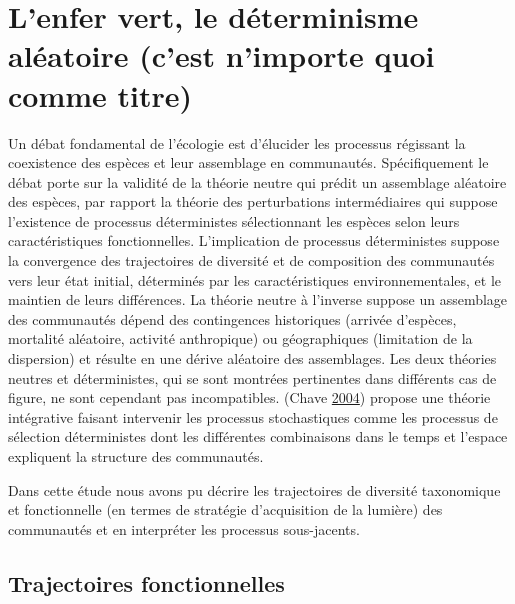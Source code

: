\documentclass[11pt,french,A4paper,extrafontsizes,onecolumn,openright]{memoir}
\begin{document}
\section{L'enfer vert, le déterminisme aléatoire (c'est n'importe quoi
comme
titre)}\label{lenfer-vert-le-determinisme-aleatoire-cest-nimporte-quoi-comme-titre}

Un débat fondamental de l'écologie est d'élucider les processus
régissant la coexistence des espèces et leur assemblage en communautés.
Spécifiquement le débat porte sur la validité de la théorie neutre qui
prédit un assemblage aléatoire des espèces, par rapport la théorie des
perturbations intermédiaires qui suppose l'existence de processus
déterministes sélectionnant les espèces selon leurs caractéristiques
fonctionnelles. L'implication de processus déterministes suppose la
convergence des trajectoires de diversité et de composition des
communautés vers leur état initial, déterminés par les caractéristiques
environnementales, et le maintien de leurs différences. La théorie
neutre à l'inverse suppose un assemblage des communautés dépend des
contingences historiques (arrivée d'espèces, mortalité aléatoire,
activité anthropique) ou géographiques (limitation de la dispersion) et
résulte en une dérive aléatoire des assemblages. Les deux théories
neutres et déterministes, qui se sont montrées pertinentes dans
différents cas de figure, ne sont cependant pas incompatibles. (Chave
\protect\hyperlink{ref-Chave2004}{2004}) propose une théorie intégrative
faisant intervenir les processus stochastiques comme les processus de
sélection déterministes dont les différentes combinaisons dans le temps
et l'espace expliquent la structure des communautés.

Dans cette étude nous avons pu décrire les trajectoires de diversité
taxonomique et fonctionnelle (en termes de stratégie d'acquisition de la
lumière) des communautés et en interpréter les processus sous-jacents.

\subsection{Trajectoires
fonctionnelles}\label{trajectoires-fonctionnelles}
\end{document}
